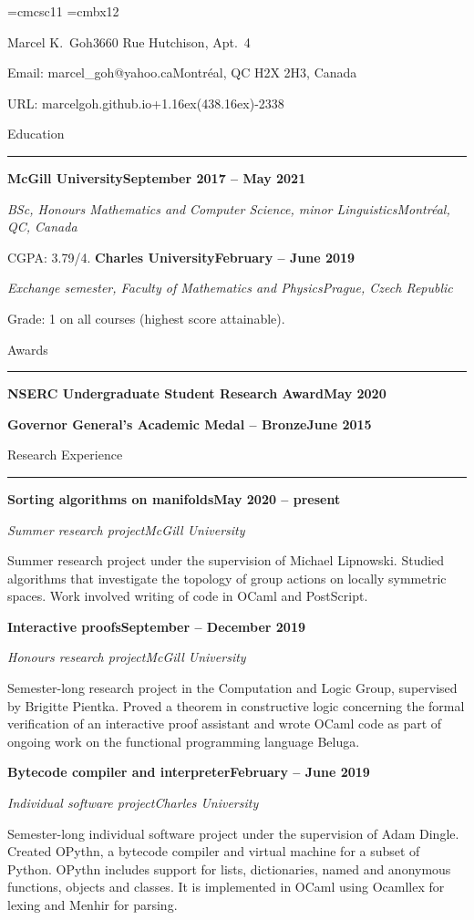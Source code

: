 
\font\elevensc=cmcsc11  %
\font\bigbold=cmbx12  %

\parindent=0pt  %

\def\up#1{\leavevmode \raise.16ex\hbox{#1}}
\def\sectheader#1{{\bigskip\elevensc #1}\smallskip\hrule\medskip}
\def\leftright#1#2{{#1}\hfill{#2}\par}

\leftright{\bigbold Marcel K.\ Goh}{3660 Rue Hutchison, Apt.\ 4}
\leftright{Email: marcel\_goh@yahoo.ca}{Montr\'eal, QC H2X 2H3, Canada}
\leftright{URL: marcelgoh.github.io}{+1\thinspace\up(438\up)\thinspace 886-2338}

\sectheader{Education}

\leftright{\bf McGill University}{\bf September 2017 -- May 2021}
\leftright{\sl BSc, Honours Mathematics and Computer Science, minor Linguistics}{\sl Montr\'eal, QC, Canada}
CGPA: 3.79/4.
\medskip
\leftright{\bf Charles University}{\bf February -- June 2019}
\leftright{\sl Exchange semester, Faculty of Mathematics and Physics}{\sl Prague, Czech Republic}
Grade: 1 on all courses (highest score attainable).

\sectheader{Awards}

\leftright{\bf NSERC Undergraduate Student Research Award}{\bf May 2020}
\smallskip
\leftright{\bf Governor General's Academic Medal -- Bronze}{\bf June 2015}

\sectheader{Research Experience}

\leftright{\bf Sorting algorithms on manifolds}{\bf May 2020 -- present}
\leftright{\sl Summer research project}{\sl McGill University}
\smallskip
Summer research project under the supervision of Michael Lipnowski.
Studied algorithms that investigate the topology of group actions on locally symmetric spaces.
Work involved writing of code in OCaml and PostScript.
\medskip

\leftright{\bf Interactive proofs}{\bf September -- December 2019}
\leftright{\sl Honours research project}{\sl McGill University}
\smallskip
Semester-long research project in the Computation and Logic Group, supervised
by Brigitte Pientka.
Proved a theorem in constructive logic concerning the formal verification
of an interactive proof assistant and wrote OCaml code as part of
ongoing work on the functional programming language Beluga.
\medskip

\leftright{\bf Bytecode compiler and interpreter}{\bf February -- June 2019}
\leftright{\sl Individual software project}{\sl Charles University}
\smallskip
Semester-long individual software project under the supervision of Adam Dingle.
Created OPythn, a bytecode compiler and virtual machine for a subset of Python.
OPythn includes support for lists, dictionaries, named and anonymous functions, objects and classes.
It is implemented in OCaml using Ocamllex for lexing and Menhir for parsing.
\medskip

